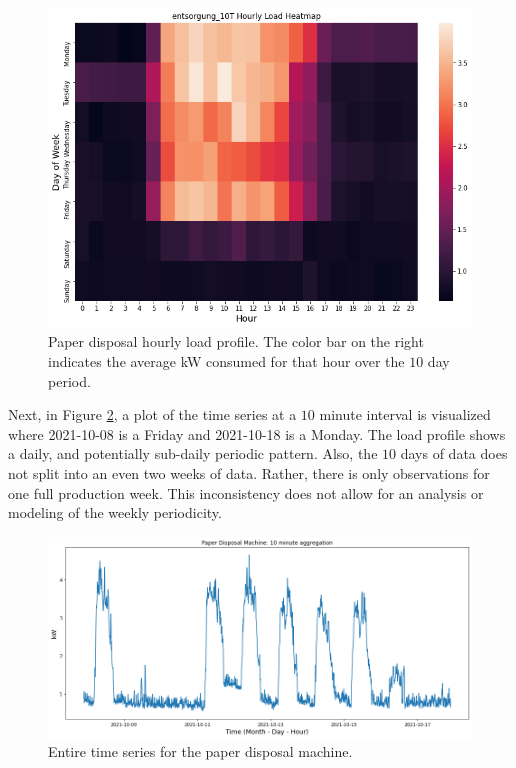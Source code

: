 \begin{figure}[H]
\centering
\graphicspath{ {./images/} }
\includegraphics[scale=0.55]{images/entsorgung_hourly_heatmap.png}
\caption{Paper disposal hourly load profile. The color bar on the right indicates the average kW consumed for that hour over the $10$ day period.}
\label{fig:fig8}
\end{figure}

Next, in Figure \ref{fig:fig9}, a plot of the time series at a $10$ minute interval is visualized where 2021-10-08 is a Friday and 2021-10-18 is a Monday. The load profile shows a daily, and potentially sub-daily periodic pattern. Also, the $10$ days of data does not split into an even two weeks of data. Rather, there is only observations for one full production week. This inconsistency does not allow for an analysis or modeling of the weekly periodicity. 

\begin{figure}[H]
\centering
\graphicspath{ {./images/} }
\includegraphics[scale=0.49]{images/entsorgung_10T_series.png}
\caption{Entire time series for the paper disposal machine.}
\label{fig:fig9}
\end{figure}

